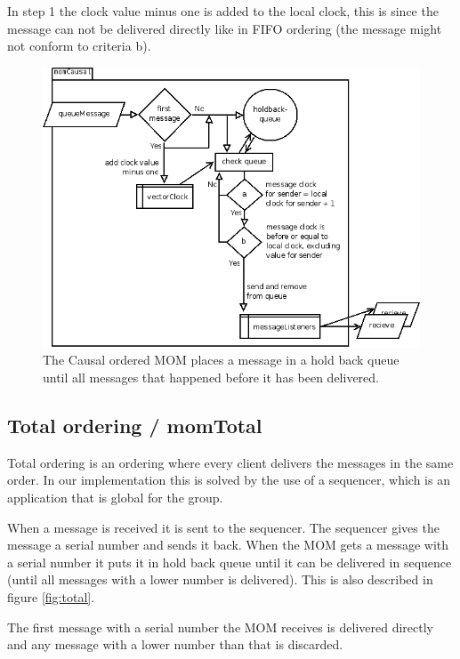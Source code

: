 \documentclass[a4paper,english]{article}
\begin{document}
In step 1 the clock value minus one is added to the local clock, this is since the message can not be delivered directly like in FIFO ordering (the message might not conform to criteria b). 

\begin{figure}
\includegraphics[width=\textwidth]{momCausal.png}
\caption{The Causal ordered MOM places a message in a hold back queue until all messages that happened before it has been delivered.}
\label{fig:causal}
\end{figure}

\subsection{Total ordering / momTotal}
\label{mo-total}
Total ordering is an ordering where every client delivers the messages in the same order. In our implementation this is solved by the use of a sequencer, which is an application that is global for the group. 

When a message is received it is sent to the sequencer. The sequencer gives the message a serial number and sends it back. When the MOM gets a message with a serial number it puts it in hold back queue until it can be delivered in sequence (until all messages with a lower number is delivered). This is also described in figure \vref{fig:total}.

The first message with a serial number the MOM receives is delivered directly and any message with a lower number than that is discarded.
\end{document}
